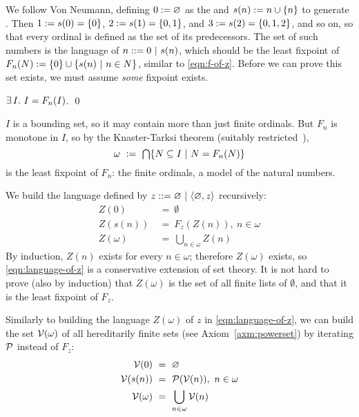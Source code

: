 We follow Von Neumann, defining $0 := \varnothing$ as the  and $s(n) := n \cup \{{n}\}$ to generate . Then $1 := s(0) = \{{0}\}$, $2 := s(1) = \{{0,1}\}$, and $3 := s(2) = \{{0,1,2}\}$, and so on, so that every ordinal is defined as the set of its predecessors. The set of such numbers is the language of $n ::= 0 \ |\  s(n)$, which should be the least fixpoint of $F_n(N) := \{{0}\} \cup \lbrace {s(n)} \ \lvert\ {n \in N} \rbrace$, similar to \eqref{eqn:f-of-z}.
Before we can prove this set exists, we must assume \emph{some} fixpoint exists.
\begin{axiom}[infinity]
$\exists\,{I}\ldotp\, I = F_n(I)$.
\qed
\end{axiom}
$I$ is a bounding set, so it may contain more than just finite ordinals. But $F_n$ is monotone in $I$, so by the Knaster-Tarksi theorem (suitably restricted~\cite{cit:paulson-1995-settheory-ii}),
\begin{equation}
  \omega\ :=\ \textstyle\bigcap \lbrace {N \subseteq I} \ \lvert\ {N = F_n(N)} \rbrace
\end{equation}
is the least fixpoint of $F_n$: the finite ordinals, a model of the natural numbers.

\begin{example}
We build the language defined by $z ::= \varnothing \ |\ \langle{\varnothing,z}\rangle$ recursively:
\begin{equation}
\begin{aligned}
	Z(0) &\ =\ \emptyset \\
	Z(s(n)) &\ =\ F_z(Z(n)),\ n \in \omega \\
	Z(\omega) &\ =\ \bigcup_{n \in \omega} Z(n)
\end{aligned}
\label{eqn:language-of-z}
\end{equation}
By induction, $Z(n)$ exists for every $n \in \omega$; therefore $Z(\omega)$ exists, so \eqref{eqn:language-of-z} is a conservative extension of set theory. It is not hard to prove (also by induction) that $Z(\omega)$ is the set of all finite lists of $\emptyset$, and that it is the least fixpoint of $F_z$.
\exampleqed
\end{example}

Similarly to building the language $Z(\omega)$ of $z$ in \eqref{eqn:language-of-z}, we can build the set $\mathcal{V}(\omega)$ of all hereditarily finite sets (see Axiom~\ref{axm:powerset}) by iterating $\mathcal{P}$ instead of $F_z$:
\begin{equation}
\begin{aligned}
	\mathcal{V}(0) &\ =\ \varnothing \\
	\mathcal{V}(s(n)) &\ =\ \mathcal{P}(\mathcal{V}(n)),\ n \in \omega \\
	\mathcal{V}(\omega) &\ =\ \bigcup_{n \in \omega} \mathcal{V}(n)
\end{aligned}
\label{eqn:finite-sets}
\end{equation}

